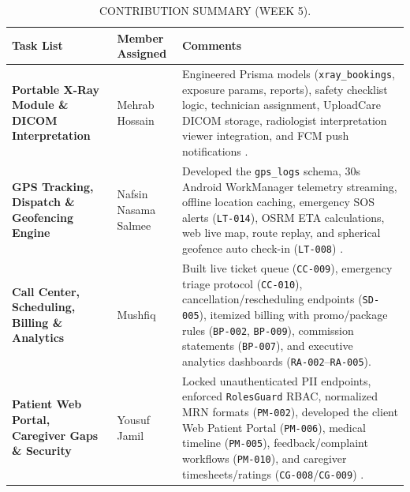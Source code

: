 \documentclass[onecolumn,journal]{IEEEtran}
\begin{document}
	\begin{table}[H]
		\centering
		\small
		\renewcommand{\arraystretch}{1.3}
		\begin{tabularx}{\textwidth}{>{\raggedright\arraybackslash}p{} >{\raggedright\arraybackslash}p{} >{\raggedright\arraybackslash}X}
			\toprule
			\textbf{Task List} & \textbf{Member Assigned} & \textbf{Comments} \\
			\midrule
			\textbf{Portable X-Ray Module \& DICOM Interpretation} & Mehrab Hossain & Engineered Prisma models (\texttt{xray\_bookings}, exposure params, reports), safety checklist logic, technician assignment, UploadCare DICOM storage, radiologist interpretation viewer integration, and FCM push notifications \cite{dicom2021, firebase2024fcm}. \\
			
			\textbf{GPS Tracking, Dispatch \& Geofencing Engine} & Nafsin Nasama Salmee & Developed the \texttt{gps\_logs} schema, 30s Android WorkManager telemetry streaming, offline location caching, emergency SOS alerts (\texttt{LT-014}), OSRM ETA calculations, web live map, route replay, and spherical geofence auto check-in (\texttt{LT-008}) \cite{zandbergen2009accuracy, osmdroid2024}. \\
			
			\textbf{Call Center, Scheduling, Billing \& Analytics} &  Mushfiq & Built live ticket queue (\texttt{CC-009}), emergency triage protocol (\texttt{CC-010}), cancellation/rescheduling endpoints (\texttt{SD-005}), itemized billing with promo/package rules (\texttt{BP-002}, \texttt{BP-009}), commission statements (\texttt{BP-007}), and executive analytics dashboards (\texttt{RA-002}--\texttt{RA-005}). \\
			
			\textbf{Patient Web Portal, Caregiver Gaps \& Security} & Yousuf Jamil & Locked unauthenticated PII endpoints, enforced \texttt{RolesGuard} RBAC, normalized MRN formats (\texttt{PM-002}), developed the client Web Patient Portal (\texttt{PM-006}), medical timeline (\texttt{PM-005}), feedback/complaint workflows (\texttt{PM-010}), and caregiver timesheets/ratings (\texttt{CG-008}/\texttt{CG-009}) \cite{jones2015jwt}. \\
			\bottomrule
		\end{tabularx}
		\vspace{8pt}
		\caption{CONTRIBUTION SUMMARY (WEEK 5).}
		\label{tab:contribution_summary_w5}
	\end{table}
	
	\FloatBarrier
	   
	{\tiny
		
	}
	\vfill
	
\end{document}
